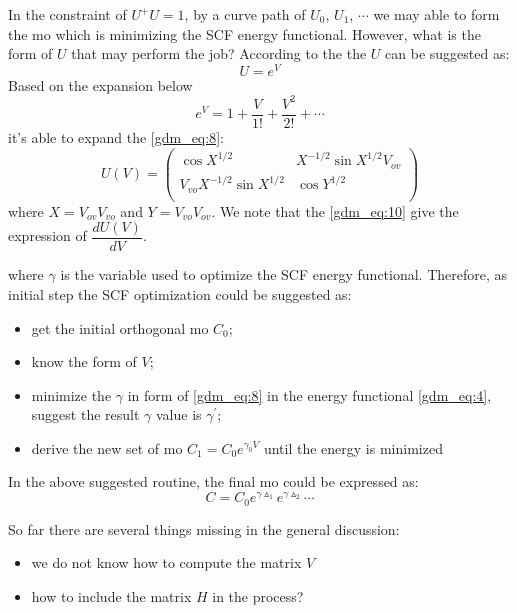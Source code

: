 In the constraint of $U^{+}U=1$, by a curve path of $U_{0}$, $U_{1}$, $\cdots$
we may able to form the mo which is minimizing the SCF energy functional. However,
what is the form of $U$ that may perform the job? According to the 
\cite{doi:10.1137/S0895479895290954} the $U$ can be suggested as:
\begin{equation}\label{gdm_eq:8}
 U = e^{V}
\end{equation}
Based on the expansion below
\begin{equation}\label{gdm_eq:9}
 e^{V} = 1 + \frac{V}{1!} + \frac{V^{2}}{2!} + \cdots
\end{equation}
it's able to expand the \ref{gdm_eq:8}:
\begin{equation}\label{gdm_eq:10}
 U(V) = 
 \begin{pmatrix}
  \cos X^{1/2}  & X^{-1/2} \sin X^{1/2} V_{ov} \\
  V_{vo}X^{-1/2} \sin X^{1/2}  & \cos Y^{1/2}  \\
 \end{pmatrix}
\end{equation}
where $X = V_{ov}V_{vo}$ and $Y = V_{vo}V_{ov}$. We note that the \ref{gdm_eq:10}
give the expression of $\dfrac{d U(V)}{d V}$.

where $\gamma$ is the variable used to optimize the SCF energy functional. Therefore,
as initial step the SCF optimization could be suggested as:
\begin{itemize}
 \item get the initial orthogonal mo $C_{0}$;
 \item know the form of $V$;
 \item minimize the $\gamma$ in form of \ref{gdm_eq:8} in the energy functional 
 \ref{gdm_eq:4}, suggest the result $\gamma$ value is $\gamma^{'}$;
 \item derive the new set of mo $C_{1} = C_{0}e^{\gamma_{0} V}$ until the energy
 is minimized
\end{itemize}
In the above suggested routine, the final mo could be expressed as:
\begin{equation}
 C = C_{0}e^{\gamma \vartriangle_{1}}e^{\gamma \vartriangle_{2}}\cdots
\end{equation}

So far there are several things missing in the general discussion:
\begin{itemize}
 \item we do not know how to compute the matrix $V$
 \item how to include the matrix $H$ in the process?
\end{itemize}

